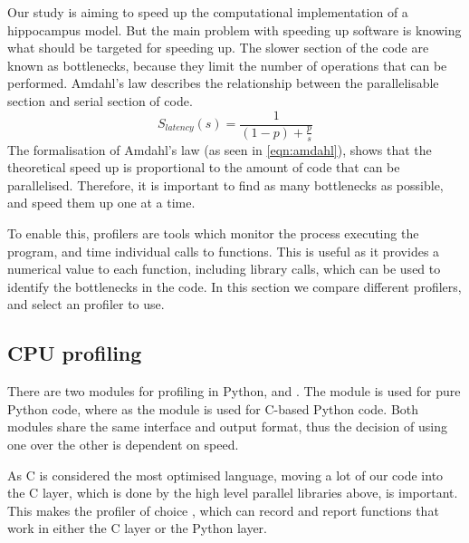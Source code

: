 


Our study is aiming to speed up the computational implementation of a hippocampus model.
But the main problem with speeding up software is knowing what should be targeted for speeding up.
The slower section of the code are known as bottlenecks, because they limit the number of operations that can be performed.
Amdahl's law describes the relationship between the parallelisable section and serial section of code.
\begin{equation}
    S_{latency}(s) = \frac{1}{(1-p)+\frac{p}{s}}
    \label{eqn:amdahl}
\end{equation}
The formalisation of Amdahl's law (as seen in \eqref{eqn:amdahl}), shows that the theoretical speed up is proportional to the amount of code that can be parallelised.
Therefore, it is important to find as many bottlenecks as possible, and speed them up one at a time.

To enable this, profilers are tools which monitor the process executing the program, and time individual calls to functions.
This is useful as it provides a numerical value to each function, including library calls, which can be used to identify the bottlenecks in the code.
In this section we compare different profilers, and select an profiler to use. 

\subsection{CPU profiling}
There are two modules for profiling in Python,  and .
The  module is used for pure Python code, where as the  module is used for C-based Python code.
Both modules share the same interface and output format, thus the decision of using one over the other is dependent on speed.

As C is considered the most optimised language, moving a lot of our code into the C layer, which is done by the high level parallel libraries above, is important.
This makes the profiler of choice , which can record and report functions that work in either the C layer or the Python layer.


